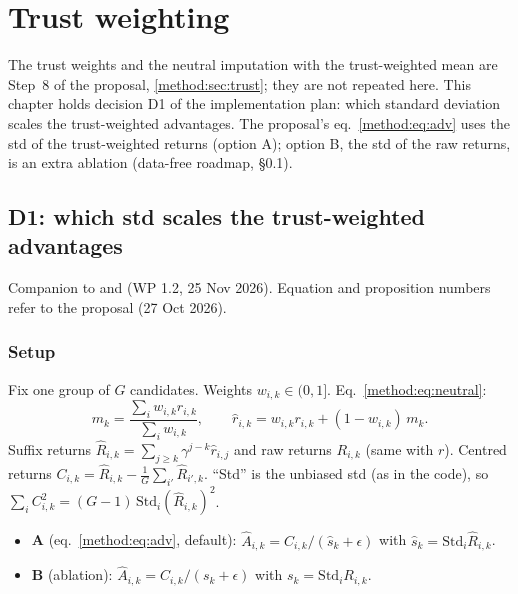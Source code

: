 \chapter{Trust weighting}\label{ch:trust}

The trust weights and the neutral imputation with the trust-weighted mean are Step~8 of the
proposal, \cref{method:sec:trust}; they are not repeated here. This chapter holds decision D1 of the
implementation plan: which standard deviation scales the trust-weighted advantages. The proposal's
eq.~\eqref{method:eq:adv} uses the std of the trust-weighted returns (option A); option B, the std of
the raw returns, is an extra ablation (data-free roadmap, §0.1).

\section{D1: which std scales the trust-weighted advantages}\label{trust:sec:d1}

Companion to  and 
(WP 1.2, 25 Nov 2026). Equation and proposition numbers refer to the proposal (27 Oct 2026).

\subsection{Setup}

Fix one group of $G$ candidates. Weights $w_{i,k}\in(0,1]$. Eq.~\eqref{method:eq:neutral}:
\[
m_k=\frac{\sum_i w_{i,k}r_{i,k}}{\sum_i w_{i,k}},\qquad \hat r_{i,k}=w_{i,k}r_{i,k}+(1-w_{i,k})\,m_k .
\]
Suffix returns $\hat R_{i,k}=\sum_{j\ge k}\gamma^{j-k}\hat r_{i,j}$ and raw returns $R_{i,k}$ (same
with $r$). Centred returns $C_{i,k}=\hat R_{i,k}-\frac1G\sum_{i'}\hat R_{i',k}$. ``Std'' is the
unbiased std (as in the code), so $\sum_i C_{i,k}^2=(G-1)\,\mathrm{Std}_i(\hat R_{i,k})^2$.

\begin{itemize}
\item \textbf{A} (eq.~\eqref{method:eq:adv}, default): $\hat A_{i,k}=C_{i,k}/(\hat s_k+\epsilon)$ with
  $\hat s_k=\mathrm{Std}_i\hat R_{i,k}$.
\item \textbf{B} (ablation): $\hat A_{i,k}=C_{i,k}/(s_k+\epsilon)$ with $s_k=\mathrm{Std}_i R_{i,k}$.
\end{itemize}

